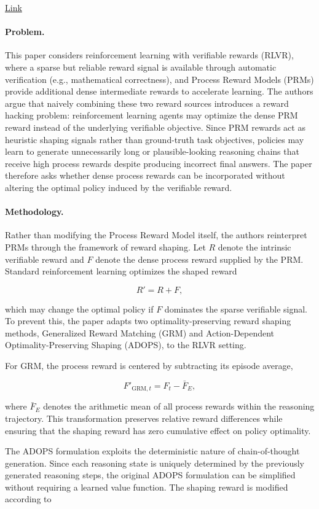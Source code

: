 \documentclass[11pt]{article}
\begin{document}
\href{https://dl.acm.org/doi/10.65109/BWFN6920}{Link}
\paragraph{Problem.}
This paper considers reinforcement learning with verifiable rewards (RLVR), where a sparse but reliable reward signal is available through automatic verification (e.g., mathematical correctness), and Process Reward Models (PRMs) provide additional dense intermediate rewards to accelerate learning. The authors argue that naively combining these two reward sources introduces a reward hacking problem: reinforcement learning agents may optimize the dense PRM reward instead of the underlying verifiable objective. Since PRM rewards act as heuristic shaping signals rather than ground-truth task objectives, policies may learn to generate unnecessarily long or plausible-looking reasoning chains that receive high process rewards despite producing incorrect final answers. The paper therefore asks whether dense process rewards can be incorporated without altering the optimal policy induced by the verifiable reward. 

\paragraph{Methodology.}
Rather than modifying the Process Reward Model itself, the authors reinterpret PRMs through the framework of reward shaping. Let \(R\) denote the intrinsic verifiable reward and \(F\) denote the dense process reward supplied by the PRM. Standard reinforcement learning optimizes the shaped reward

\[
R' = R + F,
\]

which may change the optimal policy if \(F\) dominates the sparse verifiable signal. To prevent this, the paper adapts two optimality-preserving reward shaping methods, Generalized Reward Matching (GRM) and Action-Dependent Optimality-Preserving Shaping (ADOPS), to the RLVR setting.

For GRM, the process reward is centered by subtracting its episode average,

\[
F'_{\mathrm{GRM},t}
=
F_t
-
\bar{F}_E,
\]

where \(\bar{F}_E\) denotes the arithmetic mean of all process rewards within the reasoning trajectory. This transformation preserves relative reward differences while ensuring that the shaping reward has zero cumulative effect on policy optimality.

The ADOPS formulation exploits the deterministic nature of chain-of-thought generation. Since each reasoning state is uniquely determined by the previously generated reasoning steps, the original ADOPS formulation can be simplified without requiring a learned value function. The shaping reward is modified according to
\end{document}
